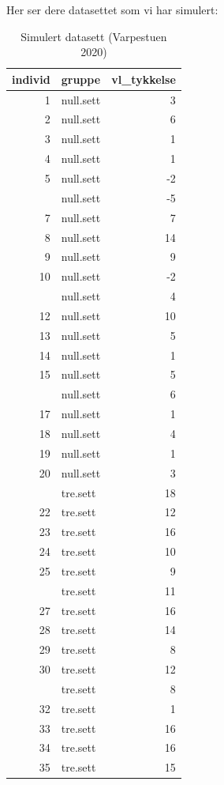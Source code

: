 \documentclass[
]{book}
\begin{document}
Her ser dere datasettet som vi har simulert:

\begin{table}

\caption{\label{tab:unnamed-chunk-2}Simulert datasett (Varpestuen 2020)}
\centering
\begin{tabular}[t]{rlr}
\toprule
individ & gruppe & vl\_tykkelse\\
\midrule
1 & null.sett & 3\\
2 & null.sett & 6\\
3 & null.sett & 1\\
4 & null.sett & 1\\
5 & null.sett & -2\\
\addlinespace
6 & null.sett & -5\\
7 & null.sett & 7\\
8 & null.sett & 14\\
9 & null.sett & 9\\
10 & null.sett & -2\\
\addlinespace
11 & null.sett & 4\\
12 & null.sett & 10\\
13 & null.sett & 5\\
14 & null.sett & 1\\
15 & null.sett & 5\\
\addlinespace
16 & null.sett & 6\\
17 & null.sett & 1\\
18 & null.sett & 4\\
19 & null.sett & 1\\
20 & null.sett & 3\\
\addlinespace
21 & tre.sett & 18\\
22 & tre.sett & 12\\
23 & tre.sett & 16\\
24 & tre.sett & 10\\
25 & tre.sett & 9\\
\addlinespace
26 & tre.sett & 11\\
27 & tre.sett & 16\\
28 & tre.sett & 14\\
29 & tre.sett & 8\\
30 & tre.sett & 12\\
\addlinespace
31 & tre.sett & 8\\
32 & tre.sett & 1\\
33 & tre.sett & 16\\
34 & tre.sett & 16\\
35 & tre.sett & 15\\

\end{tabular}
\end{table}
\end{document}
